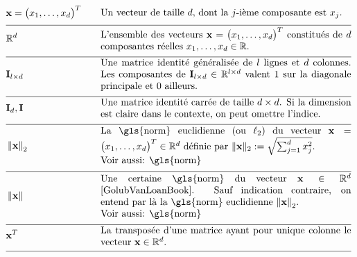 \begin{align} 
	&\featurevec=\big(\feature_{1},\ldots,\feature_{\featuredim}\big)^{T} &\quad & \parbox{.75\textwidth}{Un vecteur de taille $\featuredim$, dont la $\featureidx$-ième composante est $\feature_{\featureidx}$.} \nonumber \\[2mm] \hline \nonumber\\[-5mm]
	&\mathbb{R}^{\featuredim} & \quad &  \parbox{.75\textwidth}{L’ensemble des vecteurs $\featurevec=\big(\feature_{1},\ldots,\feature_{\featuredim}\big)^{T}$ constitués de $\featuredim$ composantes réelles $\feature_{1},\ldots,\feature_{\featuredim} \in \mathbb{R}$.} \nonumber \\[2mm] \hline \nonumber\\[-5mm]
	&\mathbf{I}_{\modelidx \times \featuredim}  & \quad &  \parbox{.75\textwidth}{Une matrice identité généralisée de $\modelidx$ lignes et $\featuredim$ colonnes. Les composantes de $\mathbf{I}_{\modelidx \times \featuredim} \in \mathbb{R}^{\modelidx \times \featuredim}$ valent $1$ sur la diagonale principale et $0$ ailleurs.} \nonumber \\[2mm] \hline \nonumber\\[-5mm]
	&\mathbf{I}_{\dimlocalmodel}, \mathbf{I} & \quad &  \parbox{.75\textwidth}{Une matrice identité carrée de taille $\dimlocalmodel \times \dimlocalmodel$. Si la dimension est claire dans le contexte, on peut omettre l'indice.} \nonumber \\[2mm] \hline \nonumber\\[-5mm]
	&\normgeneric{\featurevec}{2}  &\quad & \parbox{.75\textwidth}{La \gls{norm} euclidienne (ou $\ell_{2}$) du vecteur $\featurevec=\big(\feature_{1},\ldots,\feature_{\featuredim}\big)^{T} \in \mathbb{R}^{\featuredim}$ définie par $ \| \featurevec \|_{2} \defeq \sqrt{\sum_{\featureidx=1}^{\featuredim} \feature_{\featureidx}^{2}}$.
		\\ Voir aussi: \gls{norm}} \nonumber \\[2mm] \hline \nonumber\\[-5mm] 
	&\normgeneric{\featurevec}{}  & \quad &  \parbox{.75\textwidth}{Une certaine \gls{norm} du vecteur $\featurevec \in \mathbb{R}^{\featuredim}$ \cite{GolubVanLoanBook}. Sauf indication contraire, on entend par là la \gls{norm} euclidienne $\normgeneric{\featurevec}{2}$.
		\\ Voir aussi: \gls{norm}} \nonumber \\[2mm] \hline \nonumber\\[-5mm]
	&\featurevec^{T} &\quad & \parbox{.75\textwidth}{La transposée d’une matrice ayant pour unique colonne le vecteur $\featurevec \in \mathbb{R}^{\dimlocalmodel}$.} \nonumber \\[2mm] \hline \nonumber\\[-5mm]

\end{align}
